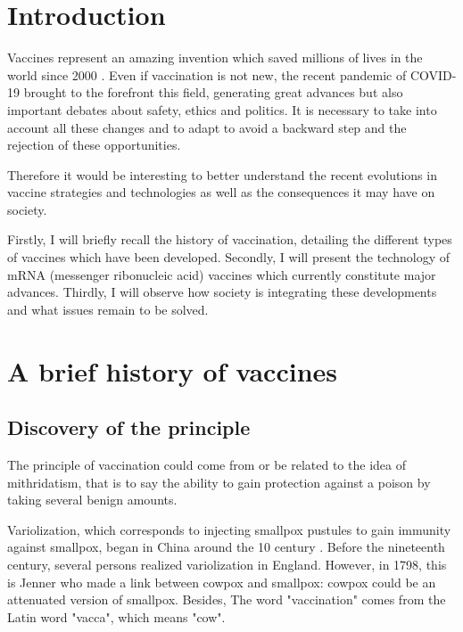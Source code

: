 \documentclass{article}
\begin{document}
    

    \section{Introduction}

    Vaccines represent an amazing invention which saved millions of lives in the world since 2000 \autocite{HowManyLives2021}.
    Even if vaccination is not new, the recent pandemic of COVID-19 brought to the forefront this field, generating great advances but also important debates about safety, ethics and politics.
    It is necessary to take into account all these changes and to adapt to avoid a backward step and the rejection of these opportunities. 
    
    Therefore it would be interesting to better understand the recent evolutions in vaccine strategies and technologies as well as the consequences it may have on society.
    
    Firstly, I will briefly recall the history of vaccination, detailing the different types of vaccines which have been developed.
    Secondly, I will present the technology of mRNA (messenger ribonucleic acid) vaccines which currently constitute major advances.
    Thirdly, I will observe how society is integrating these developments and what issues remain to be solved.

    \section{A brief history of vaccines}

        \subsection{Discovery of the principle}

            The principle of vaccination could come from or be related to the idea of mithridatism,
             that is to say the ability to gain protection against a poison by taking several benign amounts.
            
            Variolization, which corresponds to injecting smallpox pustules to gain immunity against smallpox, began in China around the 10 century \autocite{canouiHistoryPrinciplesVaccination2019}. 
            Before the nineteenth century, several persons realized variolization in England. However, in 1798, this is Jenner who made a link between cowpox and smallpox: 
                cowpox could be an attenuated version of smallpox.            
                Besides, The word "vaccination" comes from the Latin word "vacca", which means "cow".
\end{document}
